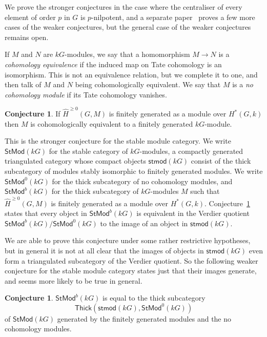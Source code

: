 \documentclass[12pt]{amsart}
\newcommand{\kG}{\kk G}
\newcommand{\kk}{k}
\newcommand{\stmod}{\mathsf{stmod}}
\newcommand{\StMod}{\mathsf{StMod}}
\newcommand{\Thick}{\mathsf{Thick}}
\renewcommand{\ge}{\geqslant}
\numberwithin{equation}{section}
\theoremstyle{plain}
\theoremstyle{definition}
\newtheorem{conjecture}[equation]{Conjecture}
\theoremstyle{remark}
\begin{document}
We prove the stronger conjectures in the case where the centraliser of
every element of order $p$ in $G$ is $p$-nilpotent, and a separate
paper~\cite{Benson/Carlson:bc19} proves a few more cases of the 
weaker conjectures, but the general
case of the weaker conjectures remains open. 


If $M$ and $N$ are $\kG$-modules, we say that a homomorphism $M \to N$ is
a \emph{cohomology equivalence} if the induced map on Tate cohomology
is an isomorphism. This is not an equivalence relation, but
we complete it to one, and then talk of
$M$ and $N$ being cohomologically
equivalent. We say that $M$ is a \emph{no cohomology module} 
if its Tate cohomology vanishes.

\begin{conjecture}\label{conj:strong-stmod}
If $\hat H^{\ge 0}(G,M)$ is finitely generated as a module over $H^*(G,\kk)$ then
$M$ is cohomologically equivalent to a finitely generated $\kG$-module.
\end{conjecture}

This is the stronger conjecture for the stable module category.
We write $\StMod(\kG)$ for the stable 
category of $\kG$-modules, a compactly generated triangulated category 
whose compact objects $\stmod(\kG)$ consist of the thick subcategory 
of modules stably isomorphic to finitely generated modules. We write $\StMod^0(\kG)$ for the thick
subcategory of no cohomology modules, and $\StMod^b(\kG)$ for the thick
subcategory of $\kG$-modules $M$ such that $\hat H^{\ge 0}(G,M)$ is finitely
generated as a module over
$H^*(G,\kk)$. Conjecture~\ref{conj:strong-stmod}
states that every object in $\StMod^b(\kG)$ is equivalent in the
Verdier quotient $\StMod^b(\kG)/\StMod^0(\kG)$ to the image of an
object in $\stmod(\kG)$.

We are able to prove this conjecture under some rather restrictive
hypotheses, but in general it is
not at all clear that the images of objects in $\stmod(\kG)$ even form
a triangulated subcategory of the Verdier quotient. So
the following weaker conjecture for the
stable module category states just that their images generate, and seems more
likely to be true in general.

\begin{conjecture}\label{conj:weak-stmod}
$\StMod^b(\kG)$ is equal to the thick subcategory 
\[ \Thick(\stmod(kG),\StMod^0(\kG)) \] 
of $\StMod(kG)$ generated by the finitely
generated modules and the no cohomology modules.
\end{conjecture}
\end{document}
